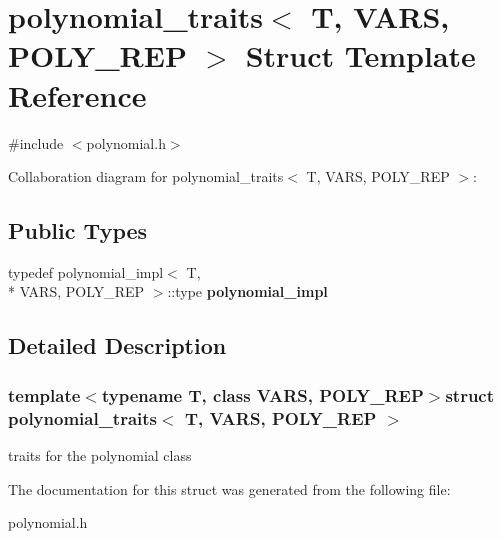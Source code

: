 \hypertarget{structpolynomial__traits}{\section{polynomial\-\_\-traits$<$ T, V\-A\-R\-S, P\-O\-L\-Y\-\_\-\-R\-E\-P $>$ Struct Template Reference}
\label{structpolynomial__traits}
}


{\ttfamily \#include $<$polynomial.\-h$>$}



Collaboration diagram for polynomial\-\_\-traits$<$ T, V\-A\-R\-S, P\-O\-L\-Y\-\_\-\-R\-E\-P $>$\-:
\subsection*{Public Types}
\begin{DoxyCompactItemize}
\item 
\hypertarget{structpolynomial__traits_a4b333428fea1558adf753729f9ef91f4}{typedef polynomial\-\_\-impl$<$ T, \\*
V\-A\-R\-S, P\-O\-L\-Y\-\_\-\-R\-E\-P $>$\-::type {\bfseries polynomial\-\_\-impl}}\label{structpolynomial__traits_a4b333428fea1558adf753729f9ef91f4}

\end{DoxyCompactItemize}


\subsection{Detailed Description}
\subsubsection*{template$<$typename T, class V\-A\-R\-S, P\-O\-L\-Y\-\_\-\-R\-E\-P$>$struct polynomial\-\_\-traits$<$ T, V\-A\-R\-S, P\-O\-L\-Y\-\_\-\-R\-E\-P $>$}

traits for the polynomial class 

The documentation for this struct was generated from the following file\-:\begin{DoxyCompactItemize}
\item 
polynomial.\-h\end{DoxyCompactItemize}
